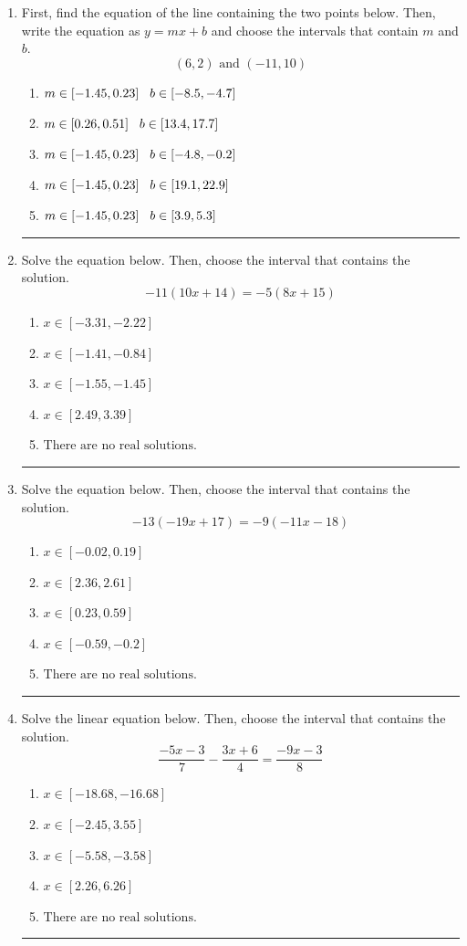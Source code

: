 \documentclass[14pt]{extbook}
\newcommand{\litem}[1]{\item#1\hspace*{-1cm}\rule{\textwidth}{0.4pt}}
\begin{document}
\begin{enumerate}
{\begin{enumerate}[label=\Alph*.]
\end{enumerate} }
\litem{
First, find the equation of the line containing the two points below. Then, write the equation as $ y=mx+b $ and choose the intervals that contain $m$ and $b$.\[ (6, 2) \text{ and } (-11, 10) \]\begin{enumerate}[label=\Alph*.]
\item \( m \in [-1.45, 0.23] \hspace*{3mm} b \in [-8.5, -4.7] \)
\item \( m \in [0.26, 0.51] \hspace*{3mm} b \in [13.4, 17.7] \)
\item \( m \in [-1.45, 0.23] \hspace*{3mm} b \in [-4.8, -0.2] \)
\item \( m \in [-1.45, 0.23] \hspace*{3mm} b \in [19.1, 22.9] \)
\item \( m \in [-1.45, 0.23] \hspace*{3mm} b \in [3.9, 5.3] \)

\end{enumerate} }
\litem{
Solve the equation below. Then, choose the interval that contains the solution.\[ -11(10x + 14) = -5(8x + 15) \]\begin{enumerate}[label=\Alph*.]
\item \( x \in [-3.31, -2.22] \)
\item \( x \in [-1.41, -0.84] \)
\item \( x \in [-1.55, -1.45] \)
\item \( x \in [2.49, 3.39] \)
\item \( \text{There are no real solutions.} \)

\end{enumerate} }
\litem{
Solve the equation below. Then, choose the interval that contains the solution.\[ -13(-19x + 17) = -9(-11x -18) \]\begin{enumerate}[label=\Alph*.]
\item \( x \in [-0.02, 0.19] \)
\item \( x \in [2.36, 2.61] \)
\item \( x \in [0.23, 0.59] \)
\item \( x \in [-0.59, -0.2] \)
\item \( \text{There are no real solutions.} \)

\end{enumerate} }
\litem{
Solve the linear equation below. Then, choose the interval that contains the solution.\[ \frac{-5x -3}{7} - \frac{3x + 6}{4} = \frac{-9x -3}{8} \]\begin{enumerate}[label=\Alph*.]
\item \( x \in [-18.68, -16.68] \)
\item \( x \in [-2.45, 3.55] \)
\item \( x \in [-5.58, -3.58] \)
\item \( x \in [2.26, 6.26] \)
\item \( \text{There are no real solutions.} \)


\end{enumerate}}
\end{enumerate}
\end{document}
